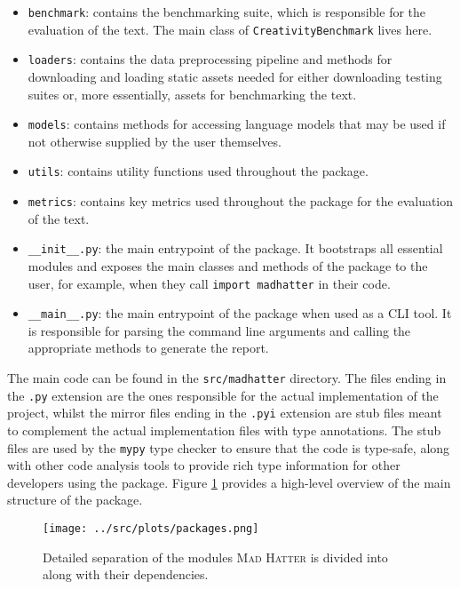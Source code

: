 \begin{itemize}
    \item \texttt{benchmark}: contains the benchmarking suite, which is responsible for the evaluation of the text. The main class of \texttt{CreativityBenchmark} lives here.
    \item \texttt{loaders}: contains the data preprocessing pipeline and methods for downloading and loading static assets needed for either downloading testing suites or, more essentially, assets for benchmarking the text. 
    \item \texttt{models}: contains methods for accessing language models that may be used if not otherwise supplied by the user themselves. 
    \item \texttt{utils}: contains utility functions used throughout the package.
    \item \texttt{metrics}: contains key metrics used throughout the package for the evaluation of the text.
    \item \texttt{\_\_init\_\_.py}: the main entrypoint of the package. It bootstraps all essential modules and exposes the main classes and methods of the package to the user, for example, when they call \texttt{import madhatter} in their code.
    \item \texttt{\_\_main\_\_.py}: the main entrypoint of the package when used as a CLI tool. It is responsible for parsing the command line arguments and calling the appropriate methods to generate the report.
\end{itemize}


The main code can be found in the \texttt{src/madhatter} directory. The files ending in the \texttt{.py} extension are the ones responsible for the actual implementation of the project, whilst the mirror files ending in the \texttt{.pyi} extension are stub files meant to complement the actual implementation files with type annotations. The stub files are used by the \texttt{mypy} type checker to ensure that the code is type-safe, along with other code analysis tools to provide rich type information for other developers using the package.
Figure \ref{fig:package_structure} provides a high-level overview of the main structure of the package.

\begin{figure}[htbp]
    \centering
    \texttt{[image: ../src/plots/packages.png]}
    \caption{Detailed separation of the modules \textsc{Mad Hatter} is divided into along with their dependencies.}
    \label{fig:package_structure}
\end{figure}

